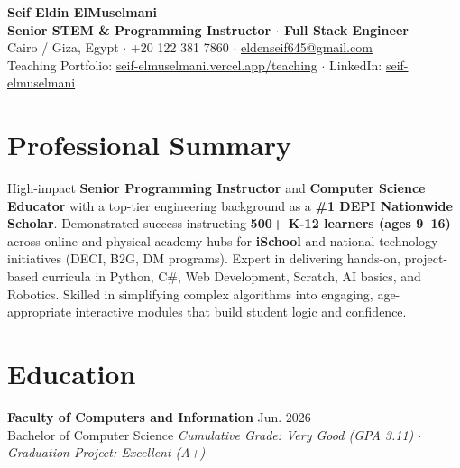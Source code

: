 \documentclass[11pt,a4paper]{article}
\begin{document}
\begin{center}
    {\huge \textbf{Seif Eldin ElMuselmani}} \\ \vspace{1.5mm}
    {\large \textbf{Senior STEM \& Programming Instructor $\cdot$ Full Stack Engineer}} \\ \vspace{1mm}
    Cairo / Giza, Egypt $\cdot$ +20 122 381 7860 $\cdot$ \href{mailto:eldenseif645@gmail.com}{eldenseif645@gmail.com} \\
    Teaching Portfolio: \href{https://seif-elmuselmani.vercel.app/teaching}{seif-elmuselmani.vercel.app/teaching} $\cdot$ LinkedIn: \href{https://linkedin.com/in/seif-elmuselmani}{seif-elmuselmani}
\end{center}

\vspace{-2.5mm}
\section{Professional Summary}
High-impact \textbf{Senior Programming Instructor} and \textbf{Computer Science Educator} with a top-tier engineering background as a \textbf{\#1 DEPI Nationwide Scholar}. Demonstrated success instructing \textbf{500+ K-12 learners (ages 9--16)} across online and physical academy hubs for \textbf{iSchool} and national technology initiatives (DECI, B2G, DM programs). Expert in delivering hands-on, project-based curricula in Python, C\#, Web Development, Scratch, AI basics, and Robotics. Skilled in simplifying complex algorithms into engaging, age-appropriate interactive modules that build student logic and confidence.

\section{Education}
\textbf{Faculty of Computers and Information} \hfill Jun. 2026 \\
Bachelor of Computer Science \hfill \textit{Cumulative Grade: Very Good (GPA 3.11) $\cdot$ Graduation Project: Excellent (A+)}

\end{document}
